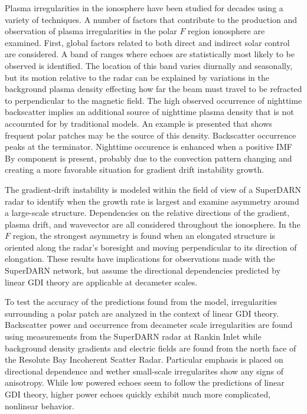 
Plasma irregularities in the ionosphere have been studied for decades using a variety of techniques.  A number of factors that contribute to the production and observation of plasma irregularities in the polar \(F\) region ionosphere are examined.  First, global factors related to both direct and indirect solar control are considered.  A band of ranges where echoes are statistically most likely to be observed is identified.  The location of this band varies diurnally and seasonally, but its motion relative to the radar can be explained by variations in the background plasma density effecting how far the beam must travel to be refracted to perpendicular to the magnetic field.  The high observed occurrence of nighttime backscatter implies an additional source of nighttime plasma density that is not accournted for by traditional models.  An example is presented that shows frequent polar patches may be the source of this density.  Backscatter occurrence peaks at the terminator.  Nighttime occurence is enhanced when a positive IMF By component is present, probably due to the convection pattern changing and creating a more favorable situation for gradient drift instability growth.

The gradient-drift instability is modeled within the field of view of a SuperDARN radar to identify when the growth rate is largest and examine asymmetry around a large-scale structure.  Dependencies on the relative directions of the gradient, plasma drift, and wavevector are all considered throughout the ionosphere.  In the \(F\) region, the strongest asymmetry is found when an elongated structure is oriented along the radar's boresight and moving perpendicular to its direction of elongation.  These results have implications for observations made with the SuperDARN network, but assume the directional dependencies predicted by linear GDI theory are applicable at decameter scales.

To test the accuracy of the predictions found from the model, irregularities surrounding a polar patch are analyzed in the context of linear GDI theory.  Backscatter power and occurrence from decameter scale irregularities are found using measurements from the SuperDARN radar at Rankin Inlet while background density gradients and electric fields are found from the north face of the Resolute Bay Incoherent Scatter Radar.  Particular emphasis is placed on directional dependence and wether small-scale irregularites show any signs of anisotropy.  While low powered echoes seem to follow the predictions of linear GDI theory, higher power echoes quickly exhibit much more complicated, nonlinear behavior.